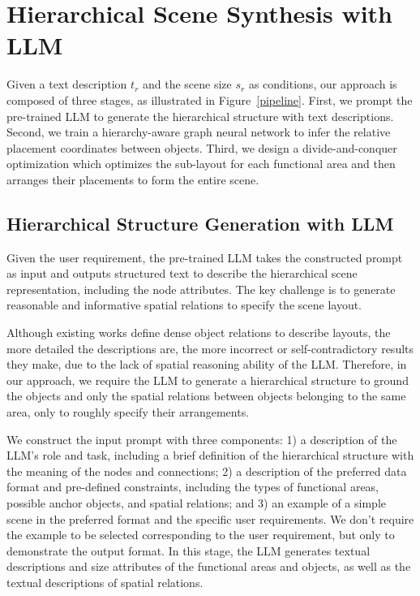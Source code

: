 \section{Hierarchical Scene Synthesis with LLM}

Given a text description $t_r$ and the scene size $s_r$ as conditions, our approach is composed of three stages, as illustrated in Figure~\ref{pipeline}. First, we prompt the pre-trained LLM to generate the hierarchical structure with text descriptions. Second, we train a hierarchy-aware graph neural network to infer the relative placement coordinates between objects.
Third, we design a divide-and-conquer optimization which optimizes the sub-layout for each functional area and then arranges their placements to form the entire scene.  

\subsection{Hierarchical Structure Generation with LLM} 
Given the user requirement, the pre-trained LLM takes the constructed prompt as input and outputs structured text to describe the hierarchical scene representation, including the node attributes. The key challenge is to generate reasonable and informative spatial relations to specify the scene layout.

Although existing works define dense object relations to describe layouts, the more detailed the descriptions are, the more incorrect or self-contradictory results they make, due to the lack of spatial reasoning ability of the LLM. Therefore, in our approach, we require the LLM to generate a hierarchical structure to ground the objects and only the spatial relations between objects belonging to the same area, only to roughly specify their arrangements.

We construct the input prompt with three components: 1) a description of the LLM's role and task, including a brief definition of the hierarchical structure with the meaning of the nodes and connections; 2) a description of the preferred data format and pre-defined constraints, including the types of functional areas, possible anchor objects, and spatial relations; and 3) an example of a simple scene in the preferred format and the specific user requirements. We don't require the example to be selected corresponding to the user requirement, but only to demonstrate the output format. In this stage, the LLM generates textual descriptions and size attributes of the functional areas and objects, as well as the textual descriptions of spatial relations.

